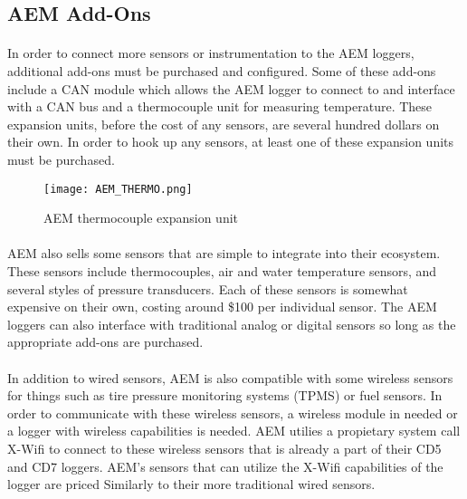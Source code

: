 \subsection{AEM Add-Ons}

\paragraph{}
In order to connect more sensors or instrumentation to the AEM loggers, additional add-ons must be purchased and configured.
Some of these add-ons include a CAN module which allows the AEM logger to connect to and interface with a CAN bus and a thermocouple unit for measuring temperature.
These expansion units, before the cost of any sensors, are several hundred dollars on their own.
In order to hook up any sensors, at least one of these expansion units must be purchased.

\begin{figure}[H]
	\centering
	\texttt{[image: AEM\_THERMO.png]}
	\caption{AEM thermocouple expansion unit}
	\label{fig:AEM_THERMO}
\end{figure}

\paragraph{}
AEM also sells some sensors that are simple to integrate into their ecosystem.
These sensors include thermocouples, air and water temperature sensors, and several styles of pressure transducers.
Each of these sensors is somewhat expensive on their own, costing around \$100 per individual sensor.
The AEM loggers can also interface with traditional analog or digital sensors so long as the appropriate add-ons are purchased.

\paragraph{}
In addition to wired sensors, AEM is also compatible with some wireless sensors for things such as tire pressure monitoring systems (TPMS) or fuel sensors.
In order to communicate with these wireless sensors, a wireless module in needed or a logger with wireless capabilities is needed.
AEM utilies a propietary system call X-Wifi to connect to these wireless sensors that is already a part of their CD5 and CD7 loggers.
AEM's sensors that can utilize the X-Wifi capabilities of the logger are priced Similarly to their more traditional wired sensors.

